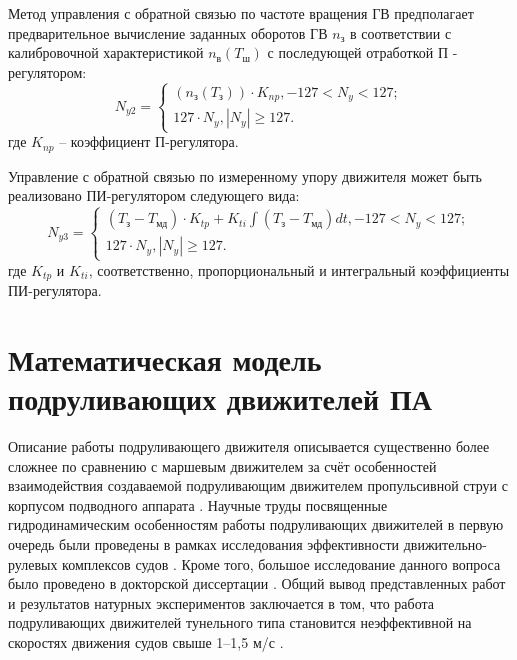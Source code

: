 Метод управления с обратной связью по частоте вращения ГВ предполагает предварительное вычисление заданных оборотов ГВ $n_{\text{з}}$ в соответствии с калибровочной характеристикой $n_{\text{в}}(T_{\text{ш}})$ с последующей отработкой П - регулятором:
\begin{equation}
    \label{eq:thruster_control_rotation}
    N_{y2} = 
    \left\{
    \begin{array}{l}
        (n_{\text{з}}(T_{\text{з}})) \cdot K_{np}, -127 < N_y < 127; \\
        127 \cdot N_y, |N_y| \geq 127.
    \end{array}
    \right.
\end{equation}
\noindent где $K_{np}$ -- коэффициент П-регулятора.

Управление с обратной связью по измеренному упору движителя может быть реализовано ПИ-регулятором следующего вида:
\begin{equation}
    \label{eq:thruster_control_thrust}
    N_{y3} = 
    \left\{
    \begin{array}{l}
        (T_\text{з} - T_\text{мд}) \cdot K_{tp} +K_{ti} \int(T_\text{з} - T_\text{мд}) dt , -127 < N_y < 127; \\
        127 \cdot N_y, |N_y| \geq 127.
    \end{array}
    \right.
\end{equation}
\noindent где $K_{tp}$ и $K_{ti}$, соответственно, пропорциональный и интегральный коэффициенты ПИ-регулятора.

\section{Математическая модель подруливающих движителей ПА}
Описание работы подруливающего движителя описывается существенно более сложнее по сравнению с маршевым движителем за счёт особенностей взаимодействия создаваемой подруливающим движителем пропульсивной струи с корпусом подводного аппарата \cite{tolstonogov2017auv}.
Научные труды посвященные гидродинамическим особенностям работы подруливающих движителей в первую очередь были проведены в рамках исследования эффективности движительно-рулевых комплексов судов \cite{chislett1966influence, english1964design, brix1973lateral}.
Кроме того, большое исследование данного вопроса было проведено в докторской диссертации \cite{nienhuis1992analysis}.
Общий вывод представленных работ и результатов натурных экспериментов заключается в том, что работа подруливающих движителей тунельного типа становится неэффективной на скоростях движения судов свыше 1–1,5 м/с \cite{english63}.

